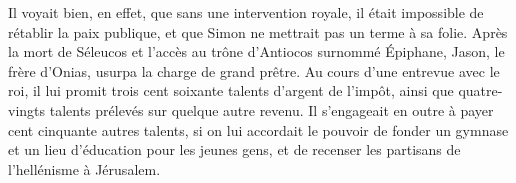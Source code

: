 Il voyait bien, en effet, que sans une intervention royale,
	il était impossible de rétablir la paix publique,
	et que Simon ne mettrait pas un terme à sa folie.
Après la mort de Séleucos et l’accès au trône d’Antiocos surnommé Épiphane,
	Jason, le frère d’Onias, usurpa la charge de grand prêtre.
Au cours d’une entrevue avec le roi,
	il lui promit trois cent soixante talents d’argent de l’impôt,
	ainsi que quatre-vingts talents prélevés sur quelque autre revenu.
Il s’engageait en outre à payer cent cinquante autres talents,
	si on lui accordait le pouvoir de fonder un gymnase
		et un lieu d’éducation pour les jeunes gens,
	et de recenser les partisans de l’hellénisme à Jérusalem.
